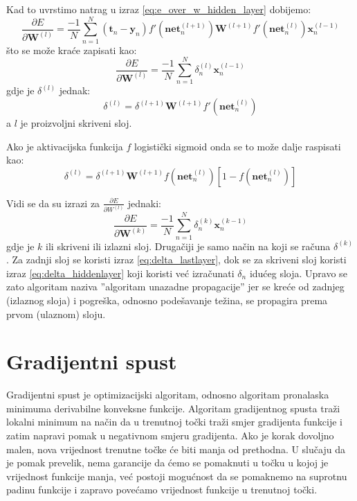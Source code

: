 \documentclass[times, utf8, diplomski, numeric]{fer}
\begin{document}
Kad to uvrstimo natrag u izraz \ref{eq:e_over_w_hidden_layer} dobijemo:
\begin{equation}
  \frac{\partial E}{\partial \boldsymbol{W}^{(l)}}
    = \frac{-1}{N} \sum_{n=1}^{N} \left( \boldsymbol{t}_{n} - \boldsymbol{y}_{n} \right) f'\left(\boldsymbol{net}_n^{(l+1)}\right) \boldsymbol{W}^{(l+1)} f'\left(\boldsymbol{net}_n^{(l)}\right) \boldsymbol{x}_n^{(l-1)}
\end{equation}
što se može kraće zapisati kao:
\begin{equation}
  \frac{\partial E}{\partial \boldsymbol{W}^{(l)}}
    = \frac{-1}{N} \sum_{n=1}^{N} \delta_n^{(l)} \boldsymbol{x}_n^{(l-1)}
\end{equation}
gdje je $\delta^{(l)}$ jednak:
\begin{equation} %
\label{eq:delta_hiddenlayer}
  \delta^{(l)}
    = \delta^{(l+1)} \boldsymbol{W}^{(l+1)} f'\left(\boldsymbol{net}_n^{(l)}\right)
\end{equation}
a $l$ je proizvoljni skriveni sloj.

Ako je aktivacijska funkcija $f$ logistički sigmoid onda se to može dalje raspisati kao:
\begin{equation}
  \delta^{(l)}
    = \delta^{(l+1)} \boldsymbol{W}^{(l+1)} f\left(\boldsymbol{net}_n^{(l)}\right) \left[ 1 - f\left(\boldsymbol{net}_n^{(l)}\right) \right]
\end{equation}

Vidi se da su izrazi za $\frac{\partial E}{\partial W^{(l)}}$ jednaki:
\begin{equation}
  \frac{\partial E}{\partial \boldsymbol{W}^{(k)}}
    = \frac{-1}{N} \sum_{n=1}^{N} \delta_n^{(k)} \boldsymbol{x}_n^{(k-1)}
\end{equation}
gdje je $k$ ili skriveni ili izlazni sloj. Drugačiji je samo način na koji se računa $\delta^{(k)}$. Za zadnji sloj se koristi izraz \ref{eq:delta_lastlayer}, dok se za skriveni sloj koristi izraz \ref{eq:delta_hiddenlayer} koji koristi već izračunati $\delta_n$ idućeg sloja. Upravo se zato algoritam naziva ''algoritam unazadne propagacije'' jer se kreće od zadnjeg (izlaznog sloja) i pogreška, odnosno podešavanje težina, se propagira prema prvom (ulaznom) sloju.

\section{Gradijentni spust}

Gradijentni spust je optimizacijski algoritam, odnosno algoritam pronalaska minimuma derivabilne konveksne funkcije. Algoritam gradijentnog spusta traži lokalni minimum na način da u trenutnoj točki traži smjer gradijenta funkcije i zatim napravi pomak u negativnom smjeru gradijenta. Ako je korak dovoljno malen, nova vrijednost trenutne točke će biti manja od prethodna.
U slučaju da je pomak prevelik, nema garancije da ćemo se pomaknuti u točku u kojoj je vrijednost funkcije manja, već postoji mogućnost da se pomaknemo na suprotnu padinu funkcije i zapravo povećamo vrijednost funkcije u trenutnoj točki.
\end{document}
